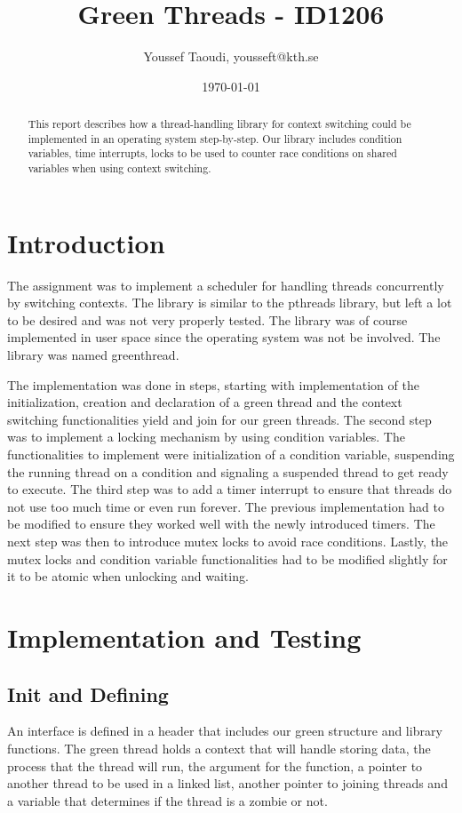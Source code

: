 \documentclass[12pt]{article}
\begin{document}
\title{Green Threads - ID1206}
\author{Youssef Taoudi, yousseft@kth.se}
\date{\today}
\maketitle

\begin{abstract}
This report describes how a thread-handling library for context switching could be implemented in an operating system step-by-step. Our library includes condition variables, time interrupts, locks to be used to counter race conditions on shared variables when using context switching.
\end{abstract}
\section{Introduction}
The assignment was to implement a scheduler for handling threads concurrently by switching contexts. The library is similar to the pthreads library, but left a lot to be desired and was not very properly tested. The library was of course implemented in user space since the operating system was not be involved.  The library was named greenthread.

The implementation was done in steps, starting with implementation of the initialization, creation and declaration of a green thread and the context switching functionalities yield and join for our green threads. The second step was to implement a locking mechanism by using condition variables. The functionalities to implement were initialization of a condition variable, suspending the running thread on a condition and signaling a suspended thread to get ready to execute. The third step was to add a timer interrupt to ensure that threads do not use too much time or even run forever. The previous implementation had to be modified to ensure they worked well with the newly introduced timers. The next step was then to introduce mutex locks to avoid race conditions. Lastly, the mutex locks and condition variable functionalities had to be modified slightly for it to be atomic when unlocking and waiting.

\section{Implementation and Testing}
\subsection{Init and Defining}
An interface is defined in a header that includes our green structure and library functions. The green thread holds a context that will handle storing data, the process that the thread will run, the argument for the function, a pointer to another thread to be used in a linked list, another pointer to joining threads and a variable that determines if the thread is a zombie or not.
\end{document}
